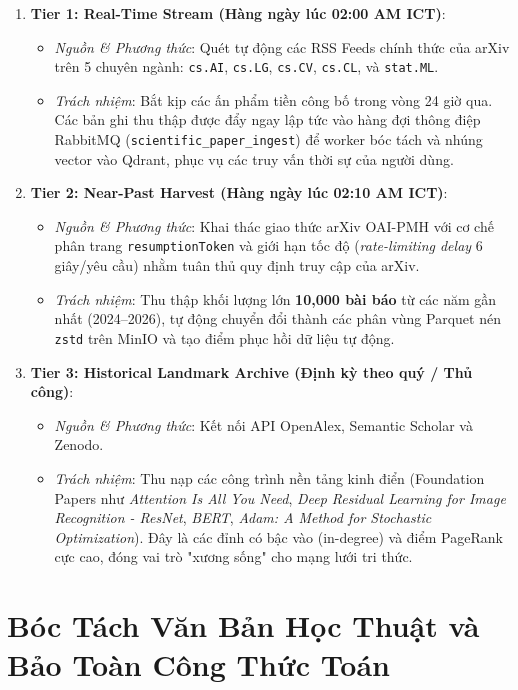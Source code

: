 \begin{enumerate}[label=\textbf{\arabic*.}]
  \item \textbf{Tier 1: Real-Time Stream (Hàng ngày lúc 02:00 AM ICT)}:
    \begin{itemize}
      \item \textit{Nguồn \& Phương thức}: Quét tự động các RSS Feeds chính thức của arXiv trên 5 chuyên ngành: \texttt{cs.AI}, \texttt{cs.LG}, \texttt{cs.CV}, \texttt{cs.CL}, và \texttt{stat.ML}.
      \item \textit{Trách nhiệm}: Bắt kịp các ấn phẩm tiền công bố trong vòng 24 giờ qua. Các bản ghi thu thập được đẩy ngay lập tức vào hàng đợi thông điệp RabbitMQ (\texttt{scientific\_paper\_ingest}) để worker bóc tách và nhúng vector vào Qdrant, phục vụ các truy vấn thời sự của người dùng.
    \end{itemize}
  \item \textbf{Tier 2: Near-Past Harvest (Hàng ngày lúc 02:10 AM ICT)}:
    \begin{itemize}
      \item \textit{Nguồn \& Phương thức}: Khai thác giao thức arXiv OAI-PMH với cơ chế phân trang \texttt{resumptionToken} và giới hạn tốc độ (\textit{rate-limiting delay} 6 giây/yêu cầu) nhằm tuân thủ quy định truy cập của arXiv.
      \item \textit{Trách nhiệm}: Thu thập khối lượng lớn \textbf{10,000 bài báo} từ các năm gần nhất (2024--2026), tự động chuyển đổi thành các phân vùng Parquet nén \texttt{zstd} trên MinIO và tạo điểm phục hồi dữ liệu tự động.
    \end{itemize}
  \item \textbf{Tier 3: Historical Landmark Archive (Định kỳ theo quý / Thủ công)}:
    \begin{itemize}
      \item \textit{Nguồn \& Phương thức}: Kết nối API OpenAlex, Semantic Scholar và Zenodo.
      \item \textit{Trách nhiệm}: Thu nạp các công trình nền tảng kinh điển (Foundation Papers như \textit{Attention Is All You Need}, \textit{Deep Residual Learning for Image Recognition - ResNet}, \textit{BERT}, \textit{Adam: A Method for Stochastic Optimization}). Đây là các đỉnh có bậc vào (in-degree) và điểm PageRank cực cao, đóng vai trò "xương sống" cho mạng lưới tri thức.
    \end{itemize}
\end{enumerate}

\section{Bóc Tách Văn Bản Học Thuật và Bảo Toàn Công Thức Toán}

